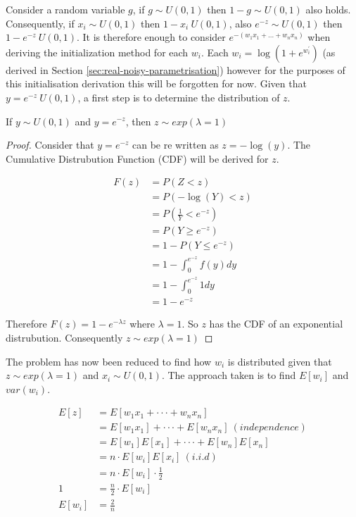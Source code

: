 Consider a random variable $g$, if $g \sim U(0,1)$ then $1 - g \sim U(0,1)$ also holds. Consequently, if $x_i \sim U(0,1)$ then $1 - x_i ~ U(0,1)$, also $e^{-z} \sim U(0,1)$ then $1 - e^{-z} ~ U(0,1)$. It is therefore enough to consider $e^{-(w_1x_1 + ... + w_nx_n)}$ when deriving the initialization method for each $w_i$. Each $w_i = \log(1 + e^{w^{'}_i})$ (as derived in Section \ref{sec:real-noisy-parametrisation}) however for the purposes of this initialisation derivation this will be forgotten for now. Given that $y = e^{-z} ~ U(0,1)$, a first step is to determine the distribution of $z$.\\
\begin{theorem}
	If $y \sim U(0,1)$ and $y = e^{-z}$, then $z \sim exp(\lambda = 1)$
\end{theorem}
\begin{proof}
	Consider that $y = e^{-z}$ can be re written as $z = -\log(y)$. The Cumulative Distrubution Function (CDF) will be derived for $z$.
	
	\begin{align*}
	F(z) &= P(Z < z)\\
	&= P(-\log(Y) < z)\\
	&= P(\frac{1}{Y} < e^{-z})\\
	&= P(Y \geq e^{-z})\\
	&= 1 - P(Y \leq e^{-z})\\
	&= 1 - \int_{0}^{e^{-z}} f(y) dy\\
	&= 1 - \int_{0}^{e^{-z}} 1 dy\\
	&= 1 - e^{-z}
	\end{align*}
	
	Therefore $F(z) = 1 - e^{-\lambda z}$ where $\lambda = 1$. So $z$ has the CDF of an exponential distrubution. Consequently $z \sim exp(\lambda = 1)$
\end{proof}

The problem has now been reduced to find how $w_i$ is distributed given that $z \sim exp(\lambda = 1)$ and $x_i \sim U(0,1)$. The approach taken is to find $E[w_i]$ and $var(w_i)$.

\begin{align*}
E[z] &= E[w_1x_1 + \cdot \cdot \cdot + w_nx_n]\\
&= E[w_1x_1] + \cdot \cdot \cdot + E[w_nx_n]\ (independence)\\
&= E[w_1]E[x_1] + \cdot \cdot \cdot + E[w_n]E[x_n]\\
&= n \cdot E[w_i]E[x_i]\ (i.i.d)\\
&= n \cdot E[w_i] \cdot \frac{1}{2}\\
1 &= \frac{n}{2} \cdot E[w_i]\\
E[w_i] &= \frac{2}{n}
\end{align*}

